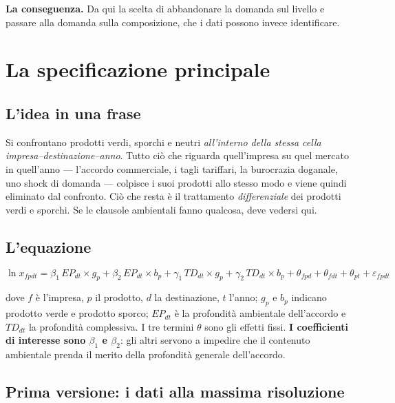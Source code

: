 \documentclass[11pt,a4paper]{article}
\begin{document}
\textbf{La conseguenza.} Da qui la scelta di abbandonare la domanda sul livello e passare
alla domanda sulla composizione, che i dati possono invece identificare.



\clearpage
\section{La specificazione principale}

\subsection{L'idea in una frase}

Si confrontano prodotti verdi, sporchi e neutri \emph{all'interno della stessa cella
impresa--destinazione--anno}. Tutto ci\`o che riguarda quell'impresa su quel mercato in
quell'anno --- l'accordo commerciale, i tagli tariffari, la burocrazia doganale, uno shock
di domanda --- colpisce i suoi prodotti allo stesso modo e viene quindi eliminato dal
confronto. Ci\`o che resta \`e il trattamento \emph{differenziale} dei prodotti verdi e
sporchi. Se le clausole ambientali fanno qualcosa, deve vedersi qui.

\subsection{L'equazione}

\begin{equation*}
\ln x_{fpdt} = \beta_1 \, EP_{dt}\times g_p + \beta_2 \, EP_{dt}\times b_p
             + \gamma_1 \, TD_{dt}\times g_p + \gamma_2 \, TD_{dt}\times b_p
             + \theta_{fpd} + \theta_{fdt} + \theta_{pt} + \varepsilon_{fpdt}
\end{equation*}

dove $f$ \`e l'impresa, $p$ il prodotto, $d$ la destinazione, $t$ l'anno; $g_p$ e $b_p$
indicano prodotto verde e prodotto sporco; $EP_{dt}$ \`e la profondit\`a ambientale
dell'accordo e $TD_{dt}$ la profondit\`a complessiva. I tre termini $\theta$ sono gli
effetti fissi. \textbf{I coefficienti di interesse sono $\beta_1$ e $\beta_2$}: gli altri
servono a impedire che il contenuto ambientale prenda il merito della profondit\`a
generale dell'accordo.

\subsection{Prima versione: i dati alla massima risoluzione}
\end{document}
